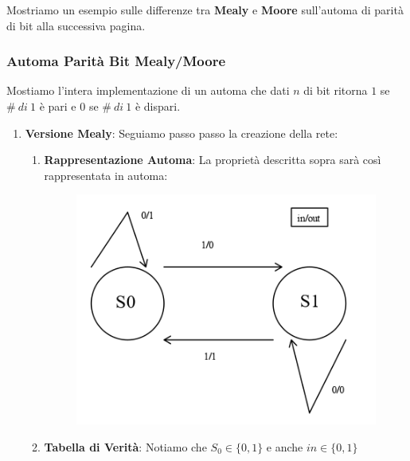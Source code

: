 \documentclass{article}
\begin{document}
\vspace*{20px}

Mostriamo un esempio sulle differenze tra \textbf{Mealy} e \textbf{Moore} sull'automa di parità di bit alla successiva pagina.

\newpage

\subsubsection{Automa Parità Bit Mealy/Moore}

Mostiamo l'intera implementazione di un automa che dati $n$ di bit ritorna $1$ se $\# \: di \: 1$ è pari e $0$ se $\# \: di \: 1$ è dispari. 

\begin{enumerate}
    \item \textbf{Versione Mealy}: Seguiamo passo passo la creazione della rete:
    \begin{enumerate}
        \item \textbf{Rappresentazione Automa}: La proprietà descritta sopra sarà così rappresentata in automa:
            \begin{figure}[htbp]
                \includegraphics[scale=0.42]{img/parita_mealy.png}
                \centering
            \end{figure}
        \vspace*{10px}
        \item \textbf{Tabella di Verità}: Notiamo che $S_{0} \in \{ 0,1 \}$ e anche $in \in \{ 0,1 \}$
        \begin{figure}[htbp]

\end{figure}
\end{enumerate}
\end{enumerate}
\end{document}

